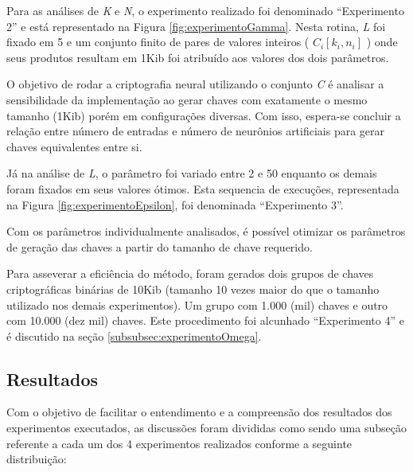 \documentclass[12pt]{article}
\begin{document}
            Para as análises de \textit{K} e \textit{N}, o experimento realizado foi denominado ``Experimento 2'' e está representado na Figura \ref{fig:experimentoGamma}. Nesta rotina, \textit{L} foi fixado em 5 e um conjunto finito de pares de valores inteiros ( $C_i [k_i, n_i]$ ) onde seus produtos resultam em 1Kib foi atribuído aos valores dos dois parâmetros.

            

            O objetivo de rodar a criptografia neural utilizando o conjunto \textit{C} é analisar a sensibilidade da implementação ao gerar chaves com exatamente o mesmo tamanho (1Kib) porém em configurações diversas. Com isso, espera-se concluir a relação entre número de entradas e número de neurônios artificiais para gerar chaves equivalentes entre si.
            
            Já na análise de \textit{L}, o parâmetro foi variado entre 2 e 50 enquanto os demais foram fixados em seus valores ótimos. Esta sequencia de execuções, representada na Figura \ref{fig:experimentoEpsilon}, foi denominada ``Experimento 3''.
            
            

            Com os parâmetros individualmente analisados, é possível otimizar os parâmetros de geração das chaves a partir do tamanho de chave requerido.
            
            Para asseverar a eficiência do método, foram gerados dois grupos de chaves criptográficas binárias de 10Kib (tamanho 10 vezes maior do que o tamanho utilizado nos demais experimentos). Um grupo com 1.000 (mil) chaves e outro com 10.000 (dez mil) chaves. Este procedimento foi alcunhado ``Experimento 4'' e é discutido na seção \ref{subsubsec:experimentoOmega}.

        \subsection{Resultados}
        \label{subsec:resultados}

            Com o objetivo de facilitar o entendimento e a compreensão dos resultados dos experimentos executados, as discussões foram divididas como sendo uma subseção referente a cada um dos 4 experimentos realizados conforme a seguinte distribuição:
\end{document}
